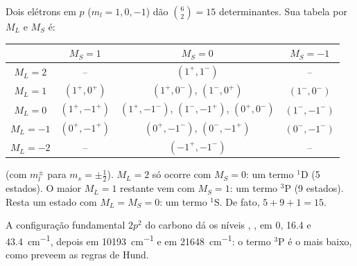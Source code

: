 \begin{example}[Os termos de $p^2$]\label{ex:b3:many-electron-atoms:p2}
Dois elétrons em $p$ ($m_l = 1, 0, -1$) dão $\binom62 = 15$ determinantes.
Sua tabela por $M_L$ e $M_S$ é:
\begin{center}\small
\begin{tabular}{c|ccc}
\hline
 & $M_S = 1$ & $M_S = 0$ & $M_S = -1$\\ \hline
$M_L = 2$ & -- & $(1^+,1^-)$ & --\\
$M_L = 1$ & $(1^+,0^+)$ & $(1^+,0^-)$, $(1^-,0^+)$ & $(1^-,0^-)$\\
$M_L = 0$ & $(1^+,-1^+)$ & $(1^+,-1^-)$, $(1^-,-1^+)$, $(0^+,0^-)$ & $(1^-,-1^-)$\\
$M_L = -1$ & $(0^+,-1^+)$ & $(0^+,-1^-)$, $(0^-,-1^+)$ & $(0^-,-1^-)$\\
$M_L = -2$ & -- & $(-1^+,-1^-)$ & --\\ \hline
\end{tabular}
\end{center}
(com $m_l^\pm$ para $m_s = \pm\frac12$). $M_L = 2$ só ocorre com $M_S = 0$:
um termo ${}^1$D (5 estados). O maior $M_L = 1$ restante vem com
$M_S = 1$: um termo ${}^3$P (9 estados). Resta um estado com $M_L = M_S = 0$: um
termo ${}^1$S. De fato, $5 + 9 + 1 = 15$.
\end{example}

\begin{example}\label{ex:b3:many-electron-atoms:carbon}
A configuração fundamental $2p^2$ do carbono dá os níveis ,
,  em 0, 16.4 e \qty{43.4}{cm^{-1}}, depois
 em \qty{10193}{cm^{-1}} e  em
\qty{21648}{cm^{-1}}: o termo ${}^3$P é o mais baixo, como preveem as regras de Hund.
\end{example}

